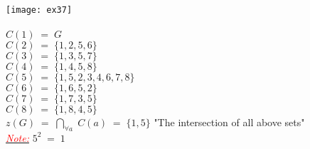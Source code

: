\documentclass{report}
\newcounter{testexample}
\begin{document}
\begin{testexample}
\boxed{\emph{\underline{\textcolor{red}{Ex: 37}}}}\\
\texttt{[image: ex37]}\\
\vspace{0.2cm}\\
$C(1) \; = \; G$\\
$C(2) \; = \; \{1 , 2 , 5 , 6\}$\\
$C(3) \; = \; \{1 , 3 , 5 , 7\}$\\
$C(4) \; = \; \{1 , 4 , 5  , 8\}$\\
$C(5) \; = \; \{1 , 5, 2 , 3 , 4 , 6 , 7 , 8\}$\\
$C(6) \; = \; \{1 , 6 , 5 , 2\}$\\
$C(7) \; = \; \{1 , 7 , 3 , 5\}$\\
$C(8) \; = \; \{1 , 8 , 4 , 5\}$\\
\newline
$z(G) \; = \; \bigcap_{\forall a} \; C(a) \; = \; \{1 , 5\}$ \hfill "The intersection of all above sets"\\
\newline
\emph{\underline{\textcolor{red}{Note:}}} \; $5^2 \; = \; 1$
\end{testexample}
\end{document}
